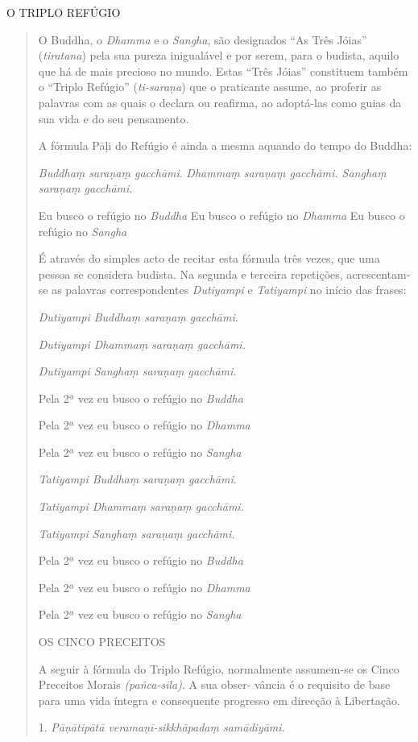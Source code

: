 O TRIPLO REFÚGIO

\begin{quote}
O Buddha, o \emph{Dhamma} e o \emph{Sangha}, são designados ``As Três Jóias'' (\emph{tiratana}) pela sua pureza inigualável e por serem, para o budista, aquilo que há de mais precioso no mundo. Estas ``Três Jóias'' constituem também o ``Triplo Refúgio'' (\emph{ti-saraṇa}) que o praticante assume, ao proferir as palavras com as quais o declara ou reafirma, ao adoptá-las como guias da sua vida e do seu pensamento.

A fórmula Pāḷi do Refúgio é ainda a mesma aquando do tempo do Buddha:

\emph{Buddhaṃ saraṇaṃ gacchāmi}. \emph{Dhammaṃ saraṇaṃ gacchāmi. Sanghaṃ saraṇaṃ gacchāmi.}

Eu busco o refúgio no \emph{Buddha} Eu busco o refúgio no \emph{Dhamma} Eu busco o refúgio no \emph{Sangha}

É através do simples acto de recitar esta fórmula três vezes, que uma pessoa se considera budista. Na segunda e terceira repetições, acrescentam-se as palavras correspondentes \emph{Dutiyampi} e \emph{Tatiyampi} no início das frases:

\emph{Dutiyampi Buddhaṃ saraṇaṃ gacchāmi}.

\emph{Dutiyampi Dhammaṃ saraṇaṃ gacchāmi.}

\emph{Dutiyampi Sanghaṃ saraṇaṃ gacchāmi.}

Pela 2ª vez eu busco o refúgio no \emph{Buddha}

Pela 2ª vez eu busco o refúgio no \emph{Dhamma}

Pela 2ª vez eu busco o refúgio no \emph{Sangha}

\emph{Tatiyampi Buddhaṃ saraṇaṃ gacchāmi}.

\emph{Tatiyampi Dhammaṃ saraṇaṃ gacchāmi.}

\emph{Tatiyampi Sanghaṃ saraṇaṃ gacchāmi.}

Pela 2ª vez eu busco o refúgio no \emph{Buddha}

Pela 2ª vez eu busco o refúgio no \emph{Dhamma}

Pela 2ª vez eu busco o refúgio no \emph{Sangha}

OS CINCO PRECEITOS

A seguir à fórmula do Triplo Refúgio, normalmente assumem-se os Cinco Preceitos Morais \emph{(pañca-sīla)}. A sua obser- vância é o requisito de base para uma vida íntegra e consequente progresso em direcção à Libertação.

1. \emph{Pāṇātipātā veramaṇī-sikkhāpadaṃ samādiyāmi.}


\end{quote}
